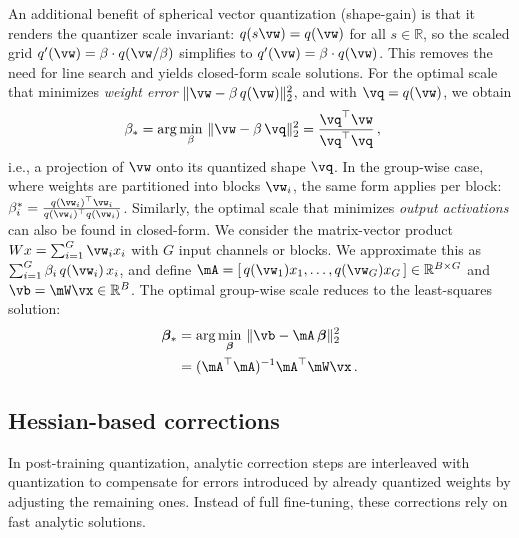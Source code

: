 \documentclass{article}
\theoremstyle{plain}
\theoremstyle{definition}
\theoremstyle{remark}
\begin{document}
An additional benefit of spherical vector quantization (shape-gain) is that it renders the quantizer scale invariant: $q(s\vw) = q(\vw)$ for all $s \in \mathbb{R}$, so the scaled grid $q'(\vw) = \beta \cdot q(\vw / \beta)$ simplifies to $q'(\vw) = \beta \cdot q(\vw)$. This removes the need for line search and yields closed-form scale solutions. For the optimal scale that minimizes \textit{weight error} $\|\vw - \beta\,q(\vw)\|_2^2$, and with $\vq = q(\vw)$, we obtain
\begin{align}
\beta_* 
&= \arg\min_{\beta}\,\|\vw - \beta\,\vq\|_2^2
= \frac{\vq^\top \vw}{\vq^\top \vq}\,,
\end{align}
i.e., a projection of $\vw$ onto its quantized shape $\vq$. In the group-wise case, where weights are partitioned into blocks $\vw_i$, the same form applies per block: $\beta_i^* = \frac{q(\vw_i)^\top \vw_i}{q(\vw_i)^\top q(\vw_i)}$. Similarly, the optimal scale that minimizes \emph{output activations} can also be found in closed-form. We consider the matrix-vector product $W x = \sum_{i=1}^{G} \vw_i x_i$ with $G$ input channels or blocks. We approximate this as $\sum_{i=1}^{G} \beta_i\,q(\vw_i)\,x_i$, and define $\mA = [\,q(\vw_1)x_1,\ldots,q(\vw_G)x_G\,] \in \mathbb{R}^{B \times G}$ and $\vb = \mW\vx \in \mathbb{R}^B$. The optimal group-wise scale reduces to the least-squares solution:
\begin{align}
\boldsymbol{\beta}_*
&= \arg\min_{\boldsymbol{\beta}}\,\|\vb - \mA\,\boldsymbol{\beta}\|_2^2 \nonumber \\ 
&= (\mA^\top \mA)^{-1} \mA^\top \mW\vx\,.
\end{align}

\subsection{Hessian-based corrections}
\label{subsec:hessian_correction}
In post-training quantization, analytic correction steps are interleaved with quantization to compensate for errors introduced by already quantized weights by adjusting the remaining ones. Instead of full fine-tuning, these corrections rely on fast analytic solutions.
\end{document}
